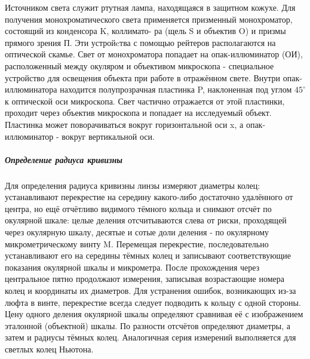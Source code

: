\documentclass[12pt]{article}
\begin{document}
		Источником света служит ртутная лампа, находящаяся в защитном кожухе. Для получения монохроматического света применяется	призменный монохроматор, состоящий из конденсора K, коллимато-
		ра (щель S и объектив O) и призмы прямого зрения П. Эти устройcтва с помощью рейтеров располагаются на оптической скамье. Свет от
		монохроматора попадает на опак-иллюминатор (ОИ), расположенный
		между окуляром и объективом микроскопа - специальное устройство
		для освещения объекта при работе в отражённом свете. Внутри опак-иллюминатора находится полупрозрачная пластинка P, наклоненная
		под углом $45^\circ$ к оптической оси микроскопа. Свет частично отражается от этой пластинки, проходит через объектив микроскопа и попадает
		на исследуемый объект. Пластинка может поворачиваться вокруг горизонтальной оси x, а опак-иллюминатор - вокруг вертикальной оси.
		
		
		\subparagraph{Определение радиуса кривизны}
		Для определения радиуса кривизны линзы измеряют диаметры колец: устанавливают перекрестие на середину какого-либо достаточно удалённого от центра, но ещё
		отчётливо видимого тёмного кольца и снимают отсчёт по окулярной
		шкале: целые деления отсчитываются слева от риски, проходящей через окулярную шкалу, десятые и сотые доли деления - по окулярному
		микрометрическому винту M.
		Перемещая перекрестие, последовательно устанавливают его на середины тёмных колец и записывают соответствующие показания окулярной шкалы и микрометра. После прохождения через центральное
		пятно продолжают измерения, записывая возрастающие номера колец
		и координаты их диаметров. Для устранения ошибок, возникающих из-за люфта в винте, перекрестие всегда следует подводить к кольцу с одной стороны. Цену одного деления окулярной шкалы определяют сравнивая её с изображением эталонной (объектной) шкалы. По разности
		отсчётов определяют диаметры, а затем и радиусы тёмных колец. Аналогичная серия измерений выполняется для светлых колец Ньютона.
		
\end{document}
